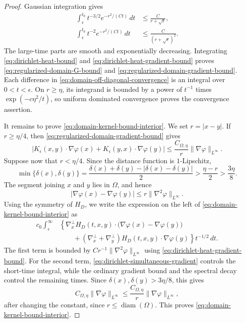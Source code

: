 \documentclass[11pt,reqno]{amsproc}
\newcommand{\Om}{\Omega}
\newcommand{\dd}{\,d}
\begin{document}
\begin{proof}
Gaussian integration gives
\begin{align*}
 \int_\epsilon^{t_0}t^{-3/2}
       e^{-r^2/(Ct)}\dd t
 &\leq \frac{C}{r+\sqrt\epsilon},\\
 \int_\epsilon^{t_0}t^{-2}
       e^{-r^2/(Ct)}\dd t
 &\leq \frac{C}{(r+\sqrt\epsilon)^2}.
\end{align*}
The large-time parts are smooth and exponentially decreasing.  Integrating
\eqref{eq:dirichlet-heat-bound} and
\eqref{eq:dirichlet-heat-gradient-bound} proves
\eqref{eq:regularized-domain-G-bound} and
\eqref{eq:regularized-domain-gradient-bound}.  Each difference in
\eqref{eq:domain-off-diagonal-convergence} is an integral over
$0<t<\epsilon$.  On $r\geq\eta$, its integrand is bounded by a power of
$t^{-1}$ times $\exp(-c\eta^2/t)$, so uniform dominated convergence proves
the convergence assertion.

It remains to prove \eqref{eq:domain-kernel-bound-interior}.  We set
$r=|x-y|$.  If $r\geq\eta/4$, then
\eqref{eq:regularized-domain-gradient-bound} gives
\[
 \left|K_\epsilon(x,y)\cdot\nabla\varphi(x)
 +K_\epsilon(y,x)\cdot\nabla\varphi(y)\right|
 \leq \frac{C_{\Om,\eta}}r\|\nabla\varphi\|_{L^\infty}.
\]
Suppose now that $r<\eta/4$.  Since the distance function is
$1$-Lipschitz,
\[
 \min\{\delta(x),\delta(y)\}
 =\frac{\delta(x)+\delta(y)-|\delta(x)-\delta(y)|}{2}
 >\frac{\eta-r}{2}>\frac{3\eta}{8}.
\]
The segment joining $x$ and $y$ lies in $\Om$, and hence
\[
 |\nabla\varphi(x)-\nabla\varphi(y)|
 \leq r\|\nabla^2\varphi\|_{L^\infty}.
\]
Using the symmetry of $H_D$, we write the expression on the left of
\eqref{eq:domain-kernel-bound-interior} as
\begin{align*}
 c_0\int_\epsilon^\infty
 &\left\{\nabla_x^\perp H_D(t,x,y)\cdot
       \bigl(\nabla\varphi(x)-\nabla\varphi(y)\bigr)\right.\\
 &\left.\qquad
 +(\nabla_x^\perp+\nabla_y^\perp)H_D(t,x,y)
       \cdot\nabla\varphi(y)\right\}t^{-1/2}\dd t.
\end{align*}
The first term is bounded by $C r^{-1}\|\nabla^2\varphi\|_{L^\infty}$
using \eqref{eq:dirichlet-heat-gradient-bound}.  For the second term,
\eqref{eq:dirichlet-simultaneous-gradient} controls the short-time integral,
while the ordinary gradient bound and the spectral decay control the
remaining times.  Since $\delta(x),\delta(y)>3\eta/8$, this gives
\[
 C_{\Om,\eta}\|\nabla\varphi\|_{L^\infty}
 \leq \frac{C_{\Om,\eta}}r\|\nabla\varphi\|_{L^\infty},
\]
after changing the constant, since $r\leq\operatorname{diam}(\Om)$.  This proves
\eqref{eq:domain-kernel-bound-interior}.
\end{proof}
\end{document}
